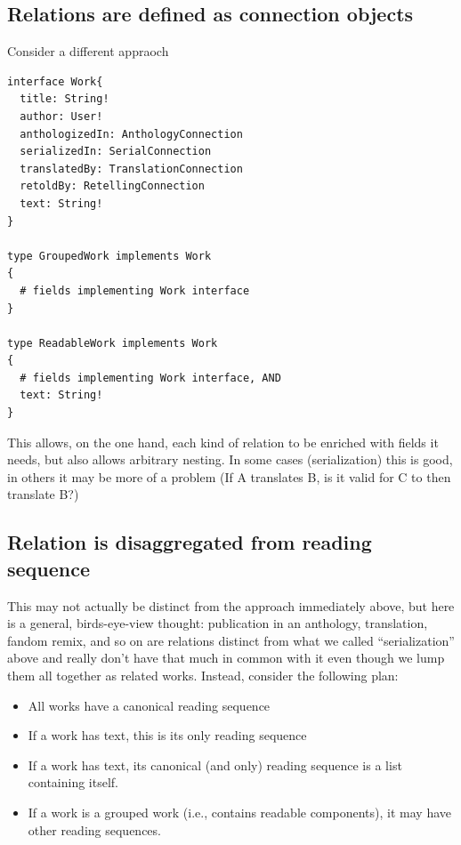 \documentclass{amsart}
\theoremstyle{remark}
\begin{document}
\subsection{Relations are defined as connection objects}
Consider a different appraoch
\begin{lstlisting}[frame=single,basicstyle=\small]
interface Work{
  title: String!
  author: User!
  anthologizedIn: AnthologyConnection
  serializedIn: SerialConnection
  translatedBy: TranslationConnection
  retoldBy: RetellingConnection
  text: String!
}

type GroupedWork implements Work
{
  # fields implementing Work interface
}

type ReadableWork implements Work
{
  # fields implementing Work interface, AND
  text: String!
}
\end{lstlisting}

This allows, on the one hand, each kind of relation to be enriched with fields it needs, but also allows arbitrary nesting. In some cases (serialization) this is good, in others it may be more of a problem (If A translates B, is it valid for C to then translate B?) 

\subsection{Relation is disaggregated from reading sequence}
This may not actually be distinct from the approach immediately above, but here is a general, birds-eye-view thought: publication in an anthology, translation, fandom remix, and so on are relations distinct from what we called ``serialization'' above and really don't have that much in common with it even though we lump them all together as related works. Instead, consider the following plan: 
\begin{itemize}
\item All works have a canonical reading sequence
\item If a work has text, this is its only reading sequence
\item If a work has text, its canonical (and only) reading sequence is a list containing itself.
\item If a work is a grouped work (i.e., contains readable components), it may have other reading sequences.
\end{itemize}
\end{document}
